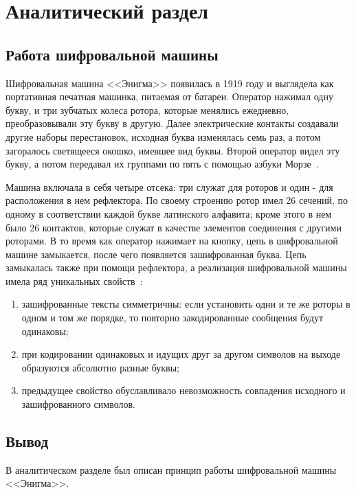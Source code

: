 \chapter{Аналитический раздел}

\section{Работа шифровальной машины}

Шифровальная машина <<Энигма>> появилась в 1919 году и выглядела как портативная печатная машинка, питаемая от батареи.
Оператор нажимал одну букву, и три зубчатых колеса ротора, которые менялись
ежедневно, преобразовывали эту букву в другую.
Далее электрические контакты создавали другие наборы перестановок, исходная буква изменялась семь раз, а потом загоралось светящееся окошко, имевшее вид буквы.
Второй оператор видел эту букву, а потом передавал их группами по пять с помощью азбуки Морзе~\cite{intro}.

Машина включала в себя четыре отсека: три служат для роторов и один - для расположения в нем рефлектора.
По своему строению ротор имел 26 сечений, по одному в соответствии каждой букве латинского алфавита; кроме этого в нем было 26 контактов, которые служат в качестве элементов соединения с другими роторами.
В то время как оператор нажимает на кнопку, цепь в шифровальной машине замыкается,  после чего появляется зашифрованная буква.
Цепь замыкалась также при помощи рефлектора, а реализация шифровальной машины имела ряд уникальных свойств~\cite{alg}:
\begin{enumerate}
	\item зашифрованные тексты симметричны: если установить одни и те же роторы в одном и том же порядке, то повторно закодированные сообщения будут одинаковы;
	\item при кодировании одинаковых и идущих друг за другом символов на выходе образуются абсолютно разные буквы;
	\item предыдущее свойство обуславливало невозможность совпадения исходного и зашифрованного символов.
\end{enumerate}

\section*{Вывод}

В аналитическом разделе был описан принцип работы шифровальной машины <<Энигма>>.